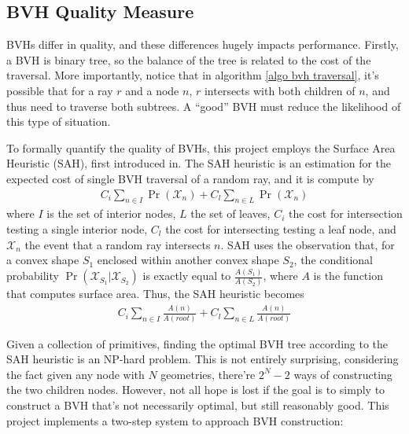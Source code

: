\subsection{BVH Quality Measure}

BVHs differ in quality, and these differences hugely impacts performance. Firstly, a BVH is binary tree, so the balance of the tree is related to the cost of the traversal. More importantly, notice that in algorithm \ref{algo bvh traversal}, it's possible that for a ray $r$ and a node $n$, $r$ intersects with both children of $n$, and thus need to traverse both subtrees. A ``good'' BVH must reduce the likelihood of this type of situation. 

To formally quantify the quality of BVHs, this project employs the Surface Area Heuristic (SAH), first introduced in\cite{goldsmith1987automatic}. The SAH heuristic is an estimation for the expected cost of single BVH traversal of a random ray, and it is compute by
\begin{align*}
    C_i \sum_{n\in I} \Pr(\mathcal{X}_n) + C_l \sum_{n\in L} \Pr(\mathcal{X}_n)
\end{align*}
where $I$ is the set of interior nodes, $L$ the set of leaves, $C_i$ the cost for intersection testing a single interior node, $C_l$ the cost for intersecting testing a leaf node, and $\mathcal{X}_n$ the event that a random ray intersects $n$. SAH uses the observation that, for a convex shape $S_1$ enclosed within another convex shape $S_2$, the conditional probability $\Pr(\mathcal{X}_{S_1} | \mathcal{X}_{S_2})$ is exactly equal to $\frac{A(S_1)}{A(S_2)}$, where $A$ is the function that computes surface area. Thus, the SAH heuristic becomes
\begin{align*}
    C_i \sum_{n\in I} \frac{A(n)}{A(root)} + C_l \sum_{n\in L} \frac{A(n)}{A(root)}
\end{align*}

Given a collection of primitives, finding the optimal BVH tree according to the SAH heuristic is an NP-hard problem\cite{bvh_optimize}. This is not entirely surprising, considering the fact given any node with $N$ geometries, there're $2^N-2$ ways of constructing the two children nodes. However, not all hope is lost if the goal is to simply to construct a BVH that's not necessarily optimal, but still reasonably good. This project implements a two-step system to approach BVH construction:

